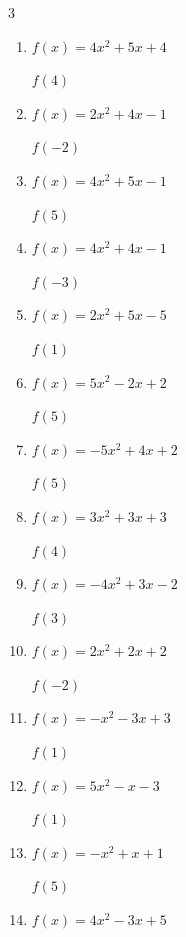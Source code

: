 \begin{multicols}{3}
\begin{enumerate}
$f(-3)$
        \phantom{$= 30$}

  \item $f(x)=4x^{2}+5x+4$

$f(4)$
        \phantom{$= 88$}

  \item $f(x)=2x^{2}+4x-1$

$f(-2)$
        \phantom{$= -1$}

  \item $f(x)=4x^{2}+5x-1$

$f(5)$
        \phantom{$= 124$}

  \item $f(x)=4x^{2}+4x-1$

$f(-3)$
        \phantom{$= 23$}

  \item $f(x)=2x^{2}+5x-5$

$f(1)$
        \phantom{$= 2$}

  \item $f(x)=5x^{2}-2x+2$

$f(5)$
        \phantom{$= 117$}

  \item $f(x)=-5x^{2}+4x+2$

$f(5)$
        \phantom{$= -103$}

  \item $f(x)=3x^{2}+3x+3$

$f(4)$
        \phantom{$= 63$}

  \item $f(x)=-4x^{2}+3x-2$

$f(3)$
        \phantom{$= -29$}

  \item $f(x)=2x^{2}+2x+2$

$f(-2)$
        \phantom{$= 6$}

  \item $f(x)=-x^{2}-3x+3$

$f(1)$
        \phantom{$= -1$}

  \item $f(x)=5x^{2}-x-3$

$f(1)$
        \phantom{$= 1$}

\columnbreak %

  \item $f(x)=-x^{2}+x+1$

$f(5)$
        \phantom{$= -19$}

  \item $f(x)=4x^{2}-3x+5$


\end{enumerate}
\end{multicols}
